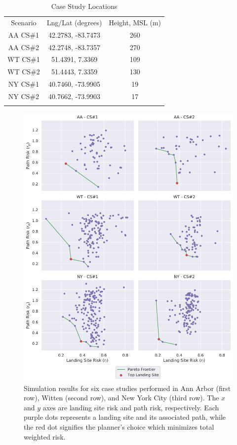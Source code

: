 \begin{table}[ht]
\centering
\caption[Emergency Landing Case Study Locations]{Case Study Locations}
\label{table:ch5_case_studies}
\begin{tabular}{c@{\qquad}c@{\qquad}c}
\hline\noalign{\smallskip}
Scenario   & Lng/Lat (degrees)        & Height, MSL (m)  \\
\noalign{\smallskip}\hline\noalign{\smallskip}
AA CS\#1    & 42.2783, -83.7473  & 260          \\
AA CS\#2    & 42.2748, -83.7357   & 270          \\
WT CS\#1    & 51.4391, 7.3369   & 109          \\
WT CS\#2    & 51.4443, 7.3359   & 130          \\
NY CS\#1    & 40.7460, -73.9905   & 19         \\
NY CS\#2    & 40.7662, -73.9903   & 17         \\
\noalign{\smallskip}\hline\noalign{\smallskip}
\end{tabular}
\end{table}

\begin{figure}[t]
    \centering
    \includegraphics[clip, trim=0.2cm 0cm 0cm 0cm, width=.80\linewidth]{chapter_5_mapping/imgs/all_pareto.pdf}
    \caption[Pareto frontier of case studies]{Simulation results for six case studies performed in Ann Arbor (first row), Witten (second row), and New York City (third row). The $x$ and $y$ axes are landing site risk and path risk, respectively. Each purple dots represents a landing site and its associated path, while the red dot signifies the planner's choice which minimizes total weighted risk.}
    \label{fig:ch5_all_pareto_plots}
\end{figure}

